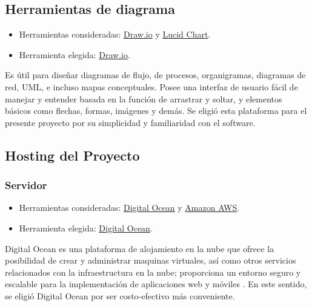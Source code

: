 \subsection{Herramientas de diagrama}
\begin{itemize}
\tightlist
\item
  Herramientas consideradas:
  \href{https://draw.io/}{Draw.io} y 
  \href{https://www.lucidchart.com/)}{Lucid Chart}.
\item
  Herramienta elegida: \href{https://draw.io/}{Draw.io}.
\end{itemize}
Es útil para diseñar diagramas de flujo, de procesos, organigramas, diagramas de red, UML, e incluso mapas conceptuales. Posee una interfaz de usuario fácil de manejar y entender basada en la función de arrastrar y soltar, y elementos básicos como flechas, formas, imágenes y demás.
Se eligió esta plataforma para el presente proyecto por su simplicidad y familiaridad con el software. \cite{art:draw_io}

\subsection{Hosting del Proyecto}

\subsubsection{Servidor}
\begin{itemize}
\tightlist
\item
  Herramientas consideradas:
  \href{https://www.digitalocean.com/}{Digital Ocean} y 
  \href{https://aws.amazon.com/es/)}{Amazon AWS}.
\item
  Herramienta elegida: \href{https://www.digitalocean.com/}{Digital Ocean}.
\end{itemize}
Digital Ocean es una plataforma de alojamiento en la nube que ofrece la posibilidad de crear y administrar maquinas virtuales, así como otros servicios relacionados con la infraestructura en la nube; proporciona un entorno seguro y escalable para la implementación de aplicaciones web y móviles \cite{art:digital_ocean}. En este sentido, se eligió Digital Ocean por ser costo-efectivo más conveniente.

